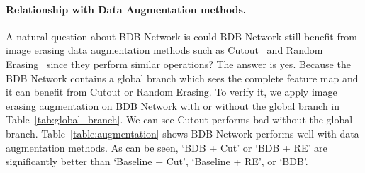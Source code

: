 \paragraph{Relationship with Data Augmentation methods.}\vspace{-4mm}
A natural question about BDB Network is could BDB Network still benefit from image erasing data augmentation methods such as Cutout~\cite{devries2017improved} and Random Erasing~\cite{zhong2017random} since they perform similar operations? The answer is yes. Because the BDB Network contains a global branch which sees the complete feature map and it can benefit from Cutout or Random Erasing. To verify it, we apply image erasing augmentation on BDB Network with or without the global branch in Table~\ref{tab:global_branch}. We can see Cutout performs bad without the global branch. Table~\ref{table:augmentation} shows BDB Network performs well with data augmentation methods. As can be seen, `BDB + Cut' or `BDB + RE' are significantly better than `Baseline + Cut', `Baseline + RE', or `BDB'.